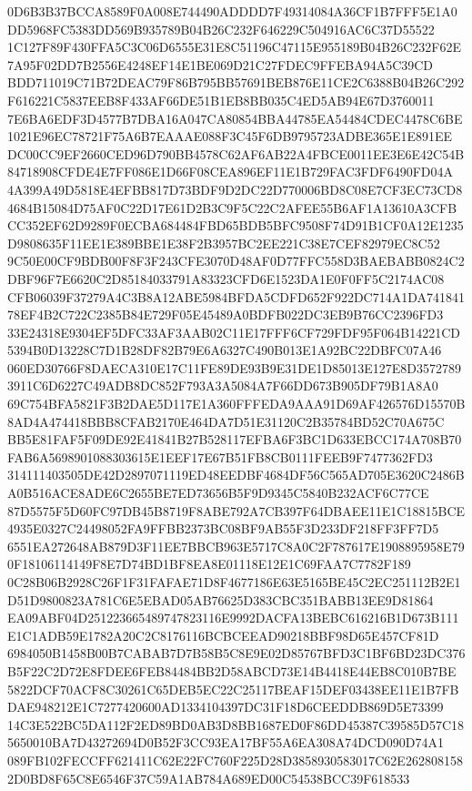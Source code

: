 \documentclass[UTF8,fontset=fandol,zihao=-4,a4paper]{ctexart}
\begin{document}
{{0D6B3B37BCCA8589F0A008E744490ADDDD7F49314084A36CF1B7FFF5E1A0DD5968FC5383DD569B935789B04B26C232F646229C504916AC6C37D55522
1C127F89F430FFA5C3C06D6555E31E8C51196C47115E955189B04B26C232F62E7A95F02DD7B2556E4248EF14E1BE069D21C27FDEC9FFEBA94A5C39CD
BDD711019C71B72DEAC79F86B795BB57691BEB876E11CE2C6388B04B26C292F616221C5837EEB8F433AF66DE51B1EB8BB035C4ED5AB94E67D3760011
7E6BA6EDF3D4577B7DBA16A047CA80854BBA44785EA54484CDEC4478C6BE1021E96EC78721F75A6B7EAAAE088F3C45F6DB9795723ADBE365E1E891EE
DC00CC9EF2660CED96D790BB4578C62AF6AB22A4FBCE0011EE3E6E42C54B84718908CFDE4E7FF086E1D66F08CEA896EF11E1B729FAC3FDF6490FD04A
4A399A49D5818E4EFBB817D73BDF9D2DC22D770006BD8C08E7CF3EC73CD84684B15084D75AF0C22D17E61D2B3C9F5C22C2AFEE55B6AF1A13610A3CFB
CC352EF62D9289F0ECBA684484FBD65BDB5BFC9508F74D91B1CF0A12E1235D9808635F11EE1E389BBE1E38F2B3957BC2EE221C38E7CEF82979EC8C52
9C50E00CF9BDB00F8F3F243CFE3070D48AF0D77FFC558D3BAEBABB0824C2DBF96F7E6620C2D85184033791A83323CFD6E1523DA1E0F0FF5C2174AC08
CFB06039F37279A4C3B8A12ABE5984BFDA5CDFD652F922DC714A1DA74184178EF4B2C722C2385B84E729F05E45489A0BDFB022DC3EB9B76CC2396FD3
33E24318E9304EF5DFC33AF3AAB02C11E17FFF6CF729FDF95F064B14221CD5394B0D13228C7D1B28DF82B79E6A6327C490B013E1A92BC22DBFC07A46
060ED30766F8DAECA310E17C11FE89DE93B9E31DE1D85013E127E8D35727893911C6D6227C49ADB8DC852F793A3A5084A7F66DD673B905DF79B1A8A0
69C754BFA5821F3B2DAE5D117E1A360FFFEDA9AAA91D69AF426576D15570B8AD4A474418BBB8CFAB2170E464DA7D51E31120C2B35784BD52C70A675C
BB5E81FAF5F09DE92E41841B27B528117EFBA6F3BC1D633EBCC174A708B70FAB6A5698901088303615E1EEF17E67B51FB8CB0111FEEB9F7477362FD3
314111403505DE42D2897071119ED48EEDBF4684DF56C565AD705E3620C2486BA0B516ACE8ADE6C2655BE7ED73656B5F9D9345C5840B232ACF6C77CE
87D5575F5D60FC97DB45B8719F8ABE792A7CB397F64DBAEE11E1C18815BCE4935E0327C24498052FA9FFBB2373BC08BF9AB55F3D233DF218FF3FF7D5
6551EA272648AB879D3F11EE7BBCB963E5717C8A0C2F787617E1908895958E790F18106114149F8E7D74BD1BF8EA8E01118E12E1C69FAA7C7782F189
0C28B06B2928C26F1F31FAFAE71D8F4677186E63E5165BE45C2EC251112B2E1D51D9800823A781C6E5EBAD05AB76625D383CBC351BABB13EE9D81864
EA09ABF04D251223665489747823116E9992DACFA13BEBC616216B1D673B111E1C1ADB59E1782A20C2C8176116BCBCEEAD90218BBF98D65E457CF81D
6984050B1458B00B7CABAB7D7B58B5C8E9E02D85767BFD3C1BF6BD23DC376B5F22C2D72E8FDEE6FEB84484BB2D58ABCD73E14B4418E44EB8C010B7BE
5822DCF70ACF8C30261C65DEB5EC22C25117BEAF15DEF03438EE11E1B7FBDAE948212E1C7277420600AD1334104397DC31F18D6CEEDDB869D5E73399
14C3E522BC5DA112F2ED89BD0AB3D8BB1687ED0F86DD45387C39585D57C185650010BA7D43272694D0B52F3CC93EA17BF55A6EA308A74DCD090D74A1
089FB102FECCFF621411C62E22FC760F225D28D3858930583017C62E2628081582D0BD8F65C8E6546F37C59A1AB784A689ED00C54538BCC39F618533
}}
\end{document}
